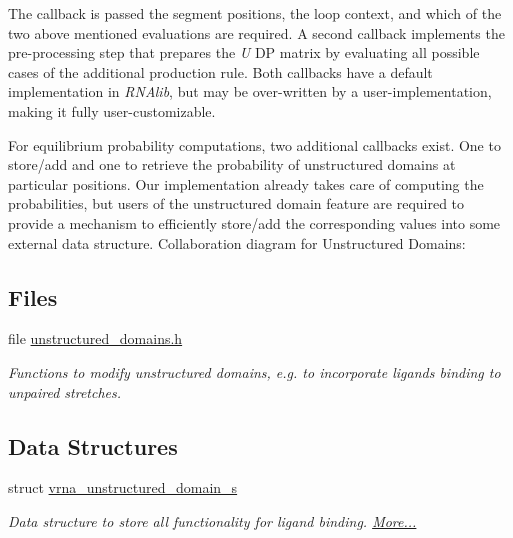 The callback is passed the segment positions, the loop context, and which of the two above mentioned evaluations are required. A second callback implements the pre-\/processing step that prepares the {\itshape U} DP matrix by evaluating all possible cases of the additional production rule. Both callbacks have a default implementation in {\itshape R\+N\+Alib}, but may be over-\/written by a user-\/implementation, making it fully user-\/customizable.

For equilibrium probability computations, two additional callbacks exist. One to store/add and one to retrieve the probability of unstructured domains at particular positions. Our implementation already takes care of computing the probabilities, but users of the unstructured domain feature are required to provide a mechanism to efficiently store/add the corresponding values into some external data structure. Collaboration diagram for Unstructured Domains\+:
\subsection*{Files}
\begin{DoxyCompactItemize}
\item 
file \mbox{\hyperlink{unstructured__domains_8h}{unstructured\+\_\+domains.\+h}}
\begin{DoxyCompactList}\small\item\em Functions to modify unstructured domains, e.\+g. to incorporate ligands binding to unpaired stretches. \end{DoxyCompactList}\end{DoxyCompactItemize}
\subsection*{Data Structures}
\begin{DoxyCompactItemize}
\item 
struct \mbox{\hyperlink{group__domains__up_structvrna__unstructured__domain__s}{vrna\+\_\+unstructured\+\_\+domain\+\_\+s}}
\begin{DoxyCompactList}\small\item\em Data structure to store all functionality for ligand binding.  \mbox{\hyperlink{group__domains__up_structvrna__unstructured__domain__s}{More...}}\end{DoxyCompactList}\end{DoxyCompactItemize}
